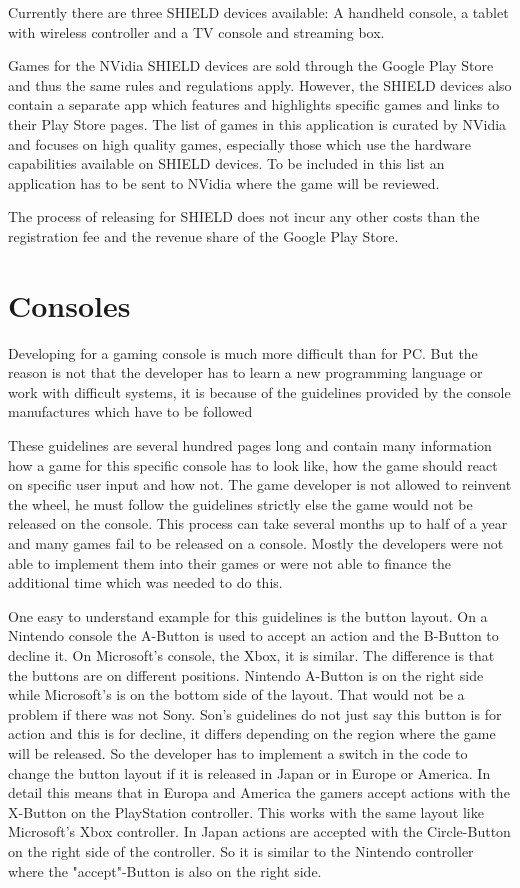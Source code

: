 Currently there are three SHIELD devices available: A handheld console, a tablet with wireless controller and a TV console and streaming box. \citep{next_generation_2016}

Games for the NVidia SHIELD devices are sold through the Google Play Store and thus the same rules and regulations apply. However, the SHIELD devices also contain a separate app which features and highlights specific games and links to their Play Store pages. The list of games in this application is curated by NVidia and focuses on high quality games, especially those which use the hardware capabilities available on SHIELD devices.  To be included in this list an application has to be sent to NVidia where the game will be reviewed. 

The process of releasing for SHIELD does not incur any other costs than the registration fee and the revenue share of the Google Play Store.

\section{Consoles}
\label{sec:consoles}
Developing for a gaming console is much more difficult than for PC. But the reason is not that the developer has to learn a new programming language or work with difficult systems, it is because of the guidelines provided by the console manufactures which have to be followed

These guidelines are several hundred pages long and contain many information how a game for this specific console has to look like, how the game should react on specific user input and how not. The game developer is not allowed to reinvent the wheel, he must follow the guidelines strictly else the game would not be released on the console. This process can take several months up to half of a year and many games fail to be released on a console. Mostly the developers were not able to implement them into their games or were not able to finance the additional time which was needed to do this.

One easy to understand example for this guidelines is the button layout. On a Nintendo console the A-Button is used to accept an action and the B-Button to decline it. On Microsoft's console, the Xbox, it is similar. The difference is that the buttons are on different positions. Nintendo A-Button is on the right side while Microsoft's is on the bottom side of the layout. That would not be a problem if there was not Sony. Son's guidelines do not just say this button is for action and this is for decline, it differs depending on the region where the game will be released. So the developer has to implement a switch in the code to change the button layout if it is released in Japan or in Europe or America. In detail this means that in Europa and America the gamers accept actions with the X-Button on the PlayStation controller. This works with the same layout like Microsoft's Xbox controller. In Japan actions are accepted with the Circle-Button on the right side of the controller. So it is similar to the Nintendo controller where the "accept"-Button is also on the right side.


